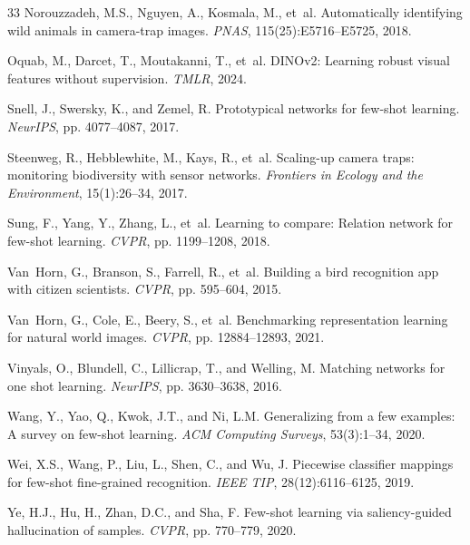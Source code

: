 \documentclass[11pt,a4paper]{article}
\begin{document}
\begin{thebibliography}{33}
Norouzzadeh, M.S., Nguyen, A., Kosmala, M., et~al.
\newblock Automatically identifying wild animals in camera-trap images.
\newblock \emph{PNAS}, 115(25):E5716--E5725, 2018.

Oquab, M., Darcet, T., Moutakanni, T., et~al.
\newblock DINOv2: Learning robust visual features without supervision.
\newblock \emph{TMLR}, 2024.

Snell, J., Swersky, K., and Zemel, R.
\newblock Prototypical networks for few-shot learning.
\newblock \emph{NeurIPS}, pp. 4077--4087, 2017.

Steenweg, R., Hebblewhite, M., Kays, R., et~al.
\newblock Scaling-up camera traps: monitoring biodiversity with sensor networks.
\newblock \emph{Frontiers in Ecology and the Environment}, 15(1):26--34, 2017.

Sung, F., Yang, Y., Zhang, L., et~al.
\newblock Learning to compare: Relation network for few-shot learning.
\newblock \emph{CVPR}, pp. 1199--1208, 2018.

Van~Horn, G., Branson, S., Farrell, R., et~al.
\newblock Building a bird recognition app with citizen scientists.
\newblock \emph{CVPR}, pp. 595--604, 2015.

Van~Horn, G., Cole, E., Beery, S., et~al.
\newblock Benchmarking representation learning for natural world images.
\newblock \emph{CVPR}, pp. 12884--12893, 2021.

Vinyals, O., Blundell, C., Lillicrap, T., and Welling, M.
\newblock Matching networks for one shot learning.
\newblock \emph{NeurIPS}, pp. 3630--3638, 2016.

Wang, Y., Yao, Q., Kwok, J.T., and Ni, L.M.
\newblock Generalizing from a few examples: A survey on few-shot learning.
\newblock \emph{ACM Computing Surveys}, 53(3):1--34, 2020.

Wei, X.S., Wang, P., Liu, L., Shen, C., and Wu, J.
\newblock Piecewise classifier mappings for few-shot fine-grained recognition.
\newblock \emph{IEEE TIP}, 28(12):6116--6125, 2019.

Ye, H.J., Hu, H., Zhan, D.C., and Sha, F.
\newblock Few-shot learning via saliency-guided hallucination of samples.
\newblock \emph{CVPR}, pp. 770--779, 2020.


\end{thebibliography}
\end{document}
